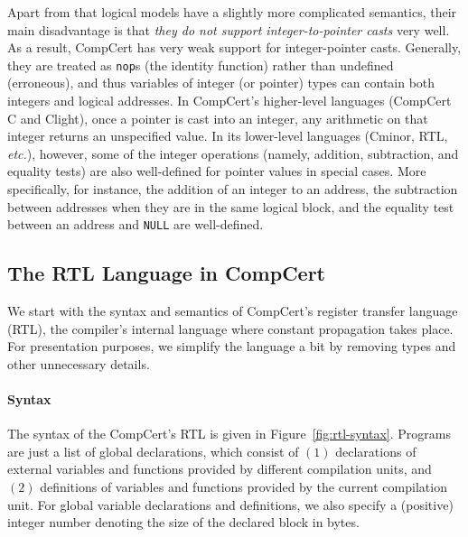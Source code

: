 Apart from that logical models have a slightly more complicated
semantics, their main disadvantage is that \emph{they do not support
  integer-to-pointer casts} very well.
As a result,
CompCert has very weak support for integer-pointer casts.  Generally,
they are treated as \texttt{nop}s (\ie the identity function) rather
than undefined (\ie erroneous), and thus variables of integer (or
pointer) types can contain both integers and logical addresses.  In
CompCert's higher-level languages (CompCert C and Clight), once a
pointer is cast into an integer, any arithmetic on that integer
returns an unspecified value.  In its lower-level languages (Cminor,
RTL, \emph{etc.}), however, some of the integer operations (namely,
addition, subtraction, and equality tests) are also well-defined for
pointer values in special cases.  More specifically, for instance,
the addition of an integer to an address, the
subtraction between addresses when they are in the same logical block,
and the equality test between an address and \texttt{NULL} are well-defined.



\subsection{The RTL Language in CompCert}
\label{sec:background:rtl}

We start with the syntax and semantics of CompCert's register transfer language (RTL), the
compiler's internal language where constant propagation takes place.  For presentation purposes, we
simplify the language a bit by removing types and other unnecessary details.


\paragraph{Syntax}

% 

The syntax of the CompCert's RTL is given in Figure~\ref{fig:rtl-syntax}.  Programs are just a list
of global declarations, which consist of $(1)$ declarations of external variables and functions
provided by different compilation units, and $(2)$ definitions of variables and functions provided
by the current compilation unit.  For global variable declarations and definitions, we also specify
a (positive) integer number denoting the size of the declared block in bytes.

